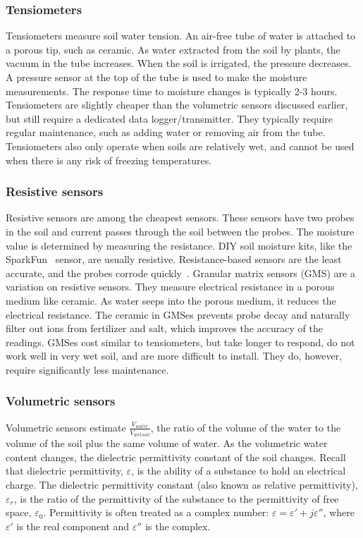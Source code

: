\documentclass[12pt]{article}
\begin{document}
\subsubsection*{Tensiometers} Tensiometers measure soil water
tension. An air-free tube of water is attached to a porous tip, such as
ceramic. As water extracted from the soil by plants, the vacuum in the
tube increases. When the soil is irrigated, the pressure decreases. A
pressure sensor at the top of the tube is used to make the moisture
measurements. The response time to moisture changes is typically 2-3
hours. Tensiometers are slightly cheaper than the volumetric sensors
discussed earlier, but still require a dedicated data
logger/transmitter. They typically require regular maintenance, such as
adding water or removing air from the tube. Tensiometers also only
operate when soils are relatively wet, and cannot be used when there
is any risk of freezing temperatures.

\subsubsection*{Resistive sensors}
Resistive sensors are among the cheapest sensors. These sensors have
two probes in the soil and current passes through the soil between the
probes. The moisture value is determined by measuring the
resistance. DIY soil moisture kits, like the SparkFun~\cite{sparkfun}
sensor, are usually resistive. Resistance-based sensors are the least
accurate, and the probes corrode quickly~\cite{capVSres}. Granular
matrix sensors (GMS) are a variation on resistive sensors. They
measure electrical resistance in a porous medium like ceramic. As
water seeps into the porous medium, it reduces the electrical
resistance. The ceramic in GMSes prevents probe decay and naturally
filter out ions from fertilizer and salt, which improves the accuracy
of the readings. GMSes cost similar to tensiometers, but take longer
to respond, do not work well in very wet soil, and are more difficult
to install. They do, however, require significantly less maintenance.

\subsubsection*{Volumetric sensors}Volumetric sensors estimate
$\frac{V_{water}}{V_{wet soil}}$, the ratio of the volume of the water
to the volume of the soil plus the same volume of water. As the
volumetric water content changes, the dielectric permittivity constant
of the soil changes. Recall that dielectric permittivity,
$\varepsilon$, is the ability of a substance to hold an electrical
charge. The dielectric permittivity constant (also known as relative
permittivity), $\varepsilon_r$, is the ratio of the permittivity of
the substance to the permittivity of free space,
$\varepsilon_0$. Permittivity is often treated as a complex number:
$\varepsilon = \varepsilon' + j\varepsilon ''$, where $\varepsilon '$
is the real component and $\varepsilon''$ is the complex.
\end{document}
